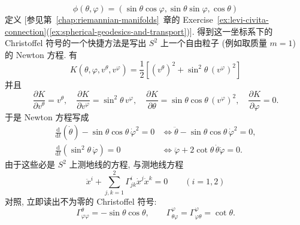 \begin{RiemannExample}
\begin{enumerate}[label=(\arabic*),ref=\arabic*,leftmargin=*]
\[  \phi(\theta,\varphi)=(\sin\theta\cos\varphi,\sin\theta\sin\varphi,\cos\theta)
\]
定义 [参见第~\ref{chap:riemannian-manifolds}~章的 Exercise~\ref{ex:levi-civita-connection}(\ref{ex:spherical-geodesics-and-transport})]. 得到这一坐标系下的 Christoffel 符号的一个快捷方法是写出 $S^2$ 上一个自由粒子 (例如取质量 $m=1$) 的 Newton 方程. 有
\[
  K(\theta,\varphi,v^\theta,v^\varphi)=\frac12\left[(v^\theta)^2+\sin^2\theta\,(v^\varphi)^2\right]
\]
并且
\[
  \frac{\partial K}{\partial v^\theta}=v^\theta,\quad
  \frac{\partial K}{\partial v^\varphi}=\sin^2\theta\,v^\varphi,\quad
  \frac{\partial K}{\partial\theta}=\sin\theta\cos\theta\,(v^\varphi)^2,\quad
  \frac{\partial K}{\partial\varphi}=0.
\]
于是 Newton 方程写成
\begin{align*}
  \frac{\mathrm{d}}{\mathrm{d}t}(\dot\theta)-\sin\theta\cos\theta\,\dot\varphi^2=0
  &\Leftrightarrow\ddot\theta-\sin\theta\cos\theta\,\dot\varphi^2=0,\\
  \frac{\mathrm{d}}{\mathrm{d}t}\left(\sin^2\theta\,\dot\varphi\right)=0
  &\Leftrightarrow\ddot\varphi+2\cot\theta\,\dot\theta\dot\varphi=0.
\end{align*}
由于这些必是 $S^2$ 上测地线的方程, 与测地线方程
\[
  \ddot x^i+\sum_{j,k=1}^2\Gamma_{jk}^i\dot x^j\dot x^k=0\qquad(i=1,2)
\]
对照, 立即读出不为零的 Christoffel 符号:
\[
  \Gamma_{\varphi\varphi}^{\theta}=-\sin\theta\cos\theta,\qquad
  \Gamma_{\theta\varphi}^{\varphi}=\Gamma_{\varphi\theta}^{\varphi}=\cot\theta.
\]
\end{enumerate}
\end{RiemannExample}

